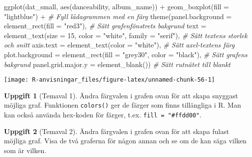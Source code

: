 \documentclass[
]{book}
\newenvironment{Shaded}{\begin{snugshade}}{\end{snugshade}}
\newcommand{\AttributeTok}[1]{\textcolor[rgb]{0.77,0.63,0.00}{#1}}
\newcommand{\CommentTok}[1]{\textcolor[rgb]{0.56,0.35,0.01}{\textit{#1}}}
\newcommand{\DecValTok}[1]{\textcolor[rgb]{0.00,0.00,0.81}{#1}}
\newcommand{\FunctionTok}[1]{\textcolor[rgb]{0.00,0.00,0.00}{#1}}
\newcommand{\NormalTok}[1]{#1}
\newcommand{\SpecialCharTok}[1]{\textcolor[rgb]{0.00,0.00,0.00}{#1}}
\newcommand{\StringTok}[1]{\textcolor[rgb]{0.31,0.60,0.02}{#1}}
\theoremstyle{definition}
\theoremstyle{definition}
\theoremstyle{definition}
\newtheorem{exercise}{Uppgift}[chapter]
\theoremstyle{definition}
\theoremstyle{remark}
\begin{document}
\begin{Shaded}
\begin{Highlighting}[]
\FunctionTok{ggplot}\NormalTok{(dat\_small, }\FunctionTok{aes}\NormalTok{(danceability, album\_name)) }\SpecialCharTok{+}
  \FunctionTok{geom\_boxplot}\NormalTok{(}\AttributeTok{fill =} \StringTok{"lightblue"}\NormalTok{) }\SpecialCharTok{+}                                         \CommentTok{\# Fyll lådagrammen med en färg}
  \FunctionTok{theme}\NormalTok{(}\AttributeTok{panel.background =} \FunctionTok{element\_rect}\NormalTok{(}\AttributeTok{fill =} \StringTok{"red3"}\NormalTok{),                      }\CommentTok{\# Sätt grafenfönstrets bakgrund}
        \AttributeTok{text =} \FunctionTok{element\_text}\NormalTok{(}\AttributeTok{size =} \DecValTok{15}\NormalTok{, }\AttributeTok{color =} \StringTok{"white"}\NormalTok{, }\AttributeTok{family =} \StringTok{"serif"}\NormalTok{),   }\CommentTok{\# Sätt textens storlek och snitt}
        \AttributeTok{axis.text =} \FunctionTok{element\_text}\NormalTok{(}\AttributeTok{color =} \StringTok{"white"}\NormalTok{),                           }\CommentTok{\# Sätt axel{-}textens färg}
        \AttributeTok{plot.background =} \FunctionTok{element\_rect}\NormalTok{(}\AttributeTok{fill =} \StringTok{"grey30"}\NormalTok{, }\AttributeTok{color =} \StringTok{"black"}\NormalTok{),    }\CommentTok{\# Sätt grafens bakgrund}
        \AttributeTok{panel.grid.major.y =} \FunctionTok{element\_blank}\NormalTok{())                                }\CommentTok{\# Sätt rutnätet till blankt}
\end{Highlighting}
\end{Shaded}

\begin{center}\texttt{[image: R-anvisningar\_files/figure-latex/unnamed-chunk-56-1]} \end{center}

\begin{exercise}[Temaval 1]
Ändra färgvalen i grafen ovan för att skapa snyggast möjliga graf. Funktionen \texttt{colors()} ger de färger som finns tillängliga i R. Man kan också använda hex-koden för färger, t.ex. \texttt{fill\ =\ "\#ffdd00"}.
\end{exercise}

\begin{exercise}[Temaval 2]
Ändra färgvalen i grafen ovan för att skapa fulast möjliga graf. Visa de två graferna för någon annan och se om de kan säga vilken som är vilken.
\end{exercise}
\end{document}
